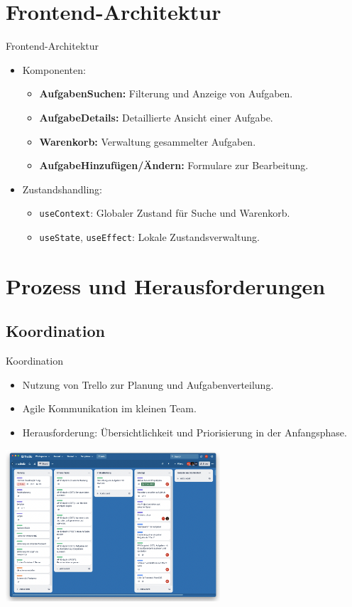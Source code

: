 \documentclass{beamer}
\begin{document}
\section{Frontend-Architektur}
\begin{frame}{Frontend-Architektur}
    \begin{itemize}
        \item Komponenten:
        \begin{itemize}
            \item \textbf{AufgabenSuchen:} Filterung und Anzeige von Aufgaben.
            \item \textbf{AufgabeDetails:} Detaillierte Ansicht einer Aufgabe.
            \item \textbf{Warenkorb:} Verwaltung gesammelter Aufgaben.
            \item \textbf{AufgabeHinzufügen/Ändern:} Formulare zur Bearbeitung.
        \end{itemize}
        \item Zustandshandling:
        \begin{itemize}
            \item \texttt{useContext}: Globaler Zustand für Suche und Warenkorb.
            \item \texttt{useState}, \texttt{useEffect}: Lokale Zustandsverwaltung.
        \end{itemize}
    \end{itemize}
\end{frame}

\section{Prozess und Herausforderungen}
\subsection{Koordination}
\begin{frame}{Koordination}
    \begin{itemize}
        \item Nutzung von Trello zur Planung und Aufgabenverteilung.
        \item Agile Kommunikation im kleinen Team.
        \item Herausforderung: Übersichtlichkeit und Priorisierung in der Anfangsphase.
    \end{itemize}
    \includegraphics[width=0.6\textwidth]{trello_screenshot.png}
\end{frame}
\end{document}
